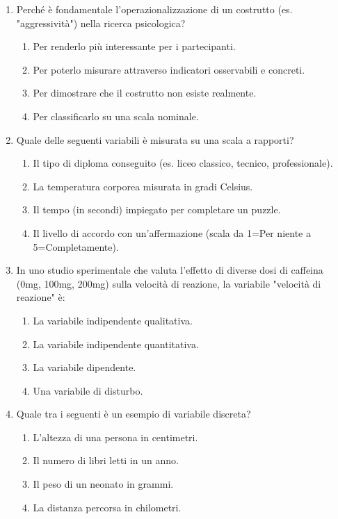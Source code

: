 \documentclass[12pt, a4paper]{article}
\begin{document}
\begin{enumerate}
    \item Perché è fondamentale l'operazionalizzazione di un costrutto (es. "aggressività") nella ricerca psicologica?
    \begin{enumerate}
        \item Per renderlo più interessante per i partecipanti.
        \item Per poterlo misurare attraverso indicatori osservabili e concreti.
        \item Per dimostrare che il costrutto non esiste realmente.
        \item Per classificarlo su una scala nominale.
    \end{enumerate}

    \item Quale delle seguenti variabili è misurata su una scala a rapporti?
    \begin{enumerate}
        \item Il tipo di diploma conseguito (es. liceo classico, tecnico, professionale).
        \item La temperatura corporea misurata in gradi Celsius.
        \item Il tempo (in secondi) impiegato per completare un puzzle.
        \item Il livello di accordo con un'affermazione (scala da 1=Per niente a 5=Completamente).
    \end{enumerate}

    \item In uno studio sperimentale che valuta l'effetto di diverse dosi di caffeina (0mg, 100mg, 200mg) sulla velocità di reazione, la variabile "velocità di reazione" è:
    \begin{enumerate}
        \item La variabile indipendente qualitativa.
        \item La variabile indipendente quantitativa.
        \item La variabile dipendente.
        \item Una variabile di disturbo.
    \end{enumerate}

    \item Quale tra i seguenti è un esempio di variabile discreta?
    \begin{enumerate}
        \item L'altezza di una persona in centimetri.
        \item Il numero di libri letti in un anno.
        \item Il peso di un neonato in grammi.
        \item La distanza percorsa in chilometri.
    \end{enumerate}


\end{enumerate}
\end{document}
